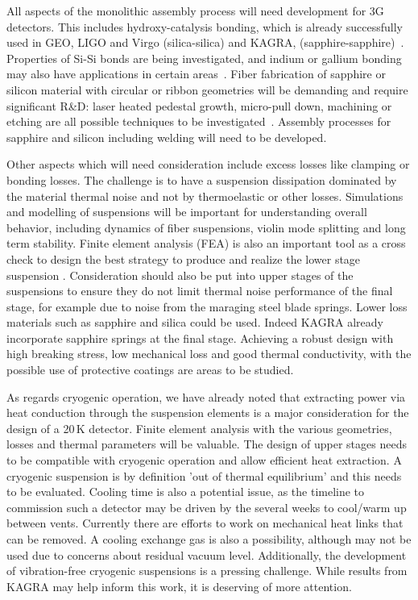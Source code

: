 All aspects of the monolithic assembly process will need development for 3G detectors. This includes hydroxy-catalysis bonding, which is already successfully used in GEO, LIGO and Virgo (silica-silica) and KAGRA, (sapphire-sapphire)~\cite{dari:2010, Amico:2002, vanVeggel:2014, Haughian:2016}. Properties of Si-Si bonds are being investigated, and indium or gallium bonding may also have applications in certain areas~\cite{Hofmann:2015, Murray:2015Low_Temp}.  Fiber fabrication of sapphire or silicon material with circular or ribbon geometries will be demanding and require significant R\&D: laser heated pedestal growth, micro-pull down, machining or etching are all possible techniques to be investigated~\cite{Cumming:2014Silicon, Alshourbagy:2005}. Assembly processes for sapphire and silicon including welding will need to be developed.

Other aspects which will need consideration include excess losses like clamping or bonding losses. The challenge is to have a suspension dissipation dominated by the material thermal noise and not by thermoelastic or other losses.
Simulations and modelling of suspensions will be important for understanding overall behavior, including dynamics of fiber suspensions, violin mode splitting and long term stability. Finite element analysis (FEA) is also an important tool as a cross check to design the best strategy to produce and realize the lower stage suspension \cite{Lorenzini:2010, Sorazu2017Sus}.
Consideration should also be put into upper stages of the suspensions to ensure they do not limit thermal noise performance of the final stage, for example due to noise from the maraging steel blade springs. Lower loss materials such as sapphire and silica could be used. Indeed KAGRA already incorporate sapphire springs at the final stage. Achieving a robust design with high breaking stress, low mechanical loss and good thermal conductivity, with the possible use of protective coatings are areas to be studied. 

As regards cryogenic operation, we have already noted that extracting power via heat conduction through the suspension elements is a major consideration for the design of a 20\,K detector. Finite element analysis with the various geometries, losses and thermal parameters will be valuable. The design of upper stages needs to be compatible with cryogenic operation and allow efficient heat extraction. A cryogenic suspension is by definition 'out of thermal equilibrium' and this needs to be evaluated. Cooling time is also a potential issue, as the timeline to commission such a detector may be driven by the several weeks to cool/warm up between vents. Currently there are efforts to work on mechanical heat links that can be removed. A cooling exchange gas is also a possibility, although may not be used due to concerns about residual vacuum level. Additionally, the development of vibration-free cryogenic suspensions is a pressing challenge. While results from KAGRA may help inform this work, it is deserving of more attention.

